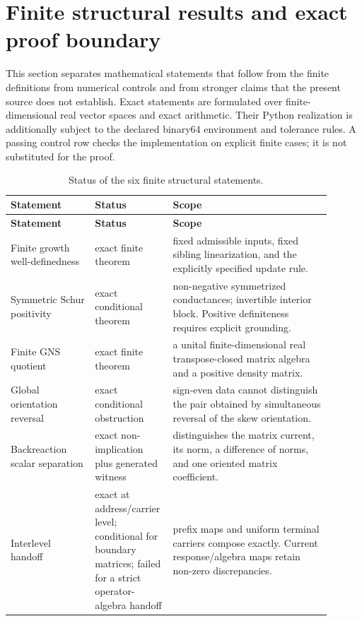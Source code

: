 \documentclass[11pt]{article}
\theoremstyle{remark}
\numberwithin{equation}{section}
\begin{document}
\newpage
\section{Finite structural results and exact proof boundary}\label{sec:finite-structural-results}
This section separates mathematical statements that follow from the finite definitions from numerical controls and from stronger claims that the present source does not establish. Exact statements are formulated over finite-dimensional real vector spaces and exact arithmetic. Their Python realization is additionally subject to the declared binary64 environment and tolerance rules. A passing control row checks the implementation on explicit finite cases; it is not substituted for the proof.

\begin{longtable}{>{\raggedright\arraybackslash}p{0.25\linewidth}>{\raggedright\arraybackslash}p{0.18\linewidth}>{\raggedright\arraybackslash}p{0.47\linewidth}}
\caption{Status of the six finite structural statements.}\label{tab:finite-structural-status}\\
\toprule
\textbf{Statement} & \textbf{Status} & \textbf{Scope}\\
\midrule
\endfirsthead
\toprule
\textbf{Statement} & \textbf{Status} & \textbf{Scope}\\
\midrule
\endhead
Finite growth well-definedness & exact finite theorem & fixed admissible inputs, fixed sibling linearization, and the explicitly specified update rule.\\\hline
Symmetric Schur positivity & exact conditional theorem & non-negative symmetrized conductances; invertible interior block. Positive definiteness requires explicit grounding.\\\hline
Finite GNS quotient & exact finite theorem & a unital finite-dimensional real transpose-closed matrix algebra and a positive density matrix.\\\hline
Global orientation reversal & exact conditional obstruction & sign-even data cannot distinguish the pair obtained by simultaneous reversal of the skew orientation.\\\hline
Backreaction scalar separation & exact non-implication plus generated witness & distinguishes the matrix current, its norm, a difference of norms, and one oriented matrix coefficient.\\\hline
Interlevel handoff & exact at address/carrier level; conditional for boundary matrices; failed for a strict operator-algebra handoff & prefix maps and uniform terminal carriers compose exactly. Current response/algebra maps retain non-zero discrepancies.\\
\bottomrule
\end{longtable}
\end{document}
